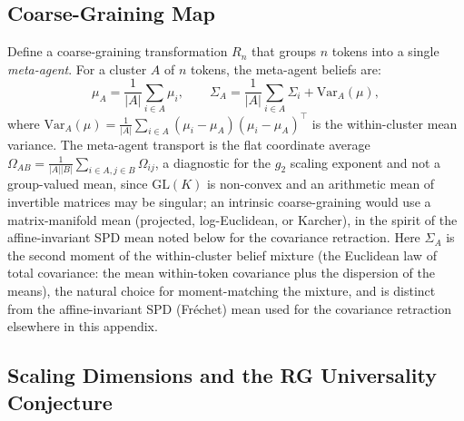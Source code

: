 \documentclass[twoside,11pt]{article}
\begin{document}
\subsection{Coarse-Graining Map}

Define a coarse-graining transformation $R_n$ that groups $n$ tokens into a single \emph{meta-agent}. For a cluster $A$ of $n$ tokens, the meta-agent beliefs are:
\begin{equation}
\mu_A = \frac{1}{|A|} \sum_{i \in A} \mu_i, \qquad
\Sigma_A = \frac{1}{|A|} \sum_{i \in A} \Sigma_i + \mathrm{Var}_A(\mu),
\label{eq:meta_agent_beliefs_supp}
\end{equation}
where $\mathrm{Var}_A(\mu) = \frac{1}{|A|} \sum_{i \in A} (\mu_i - \mu_A)(\mu_i - \mu_A)^\top$ is the within-cluster mean variance. The meta-agent transport is the flat coordinate average $\Omega_{AB} = \frac{1}{|A||B|} \sum_{i \in A, j \in B} \Omega_{ij}$, a diagnostic for the $g_2$ scaling exponent and not a group-valued mean, since $\mathrm{GL}(K)$ is non-convex and an arithmetic mean of invertible matrices may be singular; an intrinsic coarse-graining would use a matrix-manifold mean (projected, log-Euclidean, or Karcher), in the spirit of the affine-invariant SPD mean noted below for the covariance retraction. Here $\Sigma_A$ is the second moment of the within-cluster belief mixture (the Euclidean law of total covariance: the mean within-token covariance plus the dispersion of the means), the natural choice for moment-matching the mixture, and is distinct from the affine-invariant SPD (Fr\'echet) mean used for the covariance retraction elsewhere in this appendix.

\subsection{Scaling Dimensions and the RG Universality Conjecture}
\end{document}
